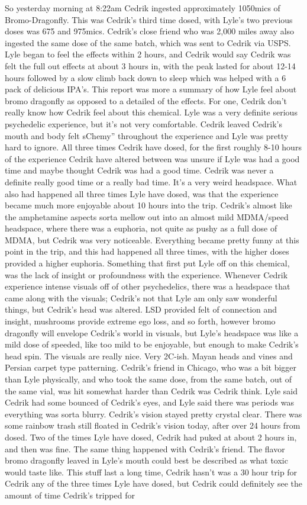 \documentclass[12pt]{book}
\begin{document}
So yesterday morning at 8:22am Cedrik ingested approximately 1050mics of Bromo-Dragonfly. This was Cedrik's third time dosed, with Lyle's two previous doses was 675 and 975mics. Cedrik's close friend who was 2,000 miles away also ingested the same dose of the same batch, which was sent to Cedrik via USPS. Lyle began to feel the effects within 2 hours, and Cedrik would say Cedrik was felt the full out effects at about 3 hours in, with the peak lasted for about 12-14 hours followed by a slow climb back down to sleep which was helped with a 6 pack of delicious IPA's. This report was more a summary of how Lyle feel about bromo dragonfly as opposed to a detailed of the effects. For one, Cedrik don't really know how Cedrik feel about this chemical. Lyle was a very definite serious psychedelic experience, but it's not very comfortable. Cedrik leaved Cedrik's mouth and body felt sChemy'' throughout the experience and Lyle was pretty hard to ignore. All three times Cedrik have dosed, for the first roughly 8-10 hours of the experience Cedrik have altered between was unsure if Lyle was had a good time and maybe thought Cedrik was had a good time. Cedrik was never a definite really good time or a really bad time. It's a very weird headspace. What also had happened all three times Lyle have dosed, was that the experience became much more enjoyable about 10 hours into the trip. Cedrik's almost like the amphetamine aspects sorta mellow out into an almost mild MDMA/speed headspace, where there was a euphoria, not quite as pushy as a full dose of MDMA, but Cedrik was very noticeable. Everything became pretty funny at this point in the trip, and this had happened all three times, with the higher doses provided a higher euphoria. Something that first put Lyle off on this chemical, was the lack of insight or profoundness with the experience. Whenever Cedrik experience intense visuals off of other psychedelics, there was a headspace that came along with the visuals; Cedrik's not that Lyle am only saw wonderful things, but Cedrik's head was altered. LSD provided felt of connection and insight, mushrooms provide extreme ego loss, and so forth, however bromo dragonfly will envelope Cedrik's world in visuals, but Lyle's headspace was like a mild dose of speeded, like too mild to be enjoyable, but enough to make Cedrik's head spin. The visuals are really nice. Very 2C-ish. Mayan heads and vines and Persian carpet type patterning. Cedrik's friend in Chicago, who was a bit bigger than Lyle physically, and who took the same dose, from the same batch, out of the same vial, was hit somewhat harder than Cedrik was Cedrik think. Lyle said Cedrik had some bounced of Cedrik's eyes, and Lyle said there was periods was everything was sorta blurry. Cedrik's vision stayed pretty crystal clear. There was some rainbow trash still floated in Cedrik's vision today, after over 24 hours from dosed. Two of the times Lyle have dosed, Cedrik had puked at about 2 hours in, and then was fine. The same thing happened with Cedrik's friend. The flavor bromo dragonfly leaved in Lyle's mouth could best be described as what toxic would taste like. This stuff last a long time, Cedrik hasn't was a 30 hour trip for Cedrik any of the three times Lyle have dosed, but Cedrik could definitely see the amount of time Cedrik's tripped for 
\end{document}
